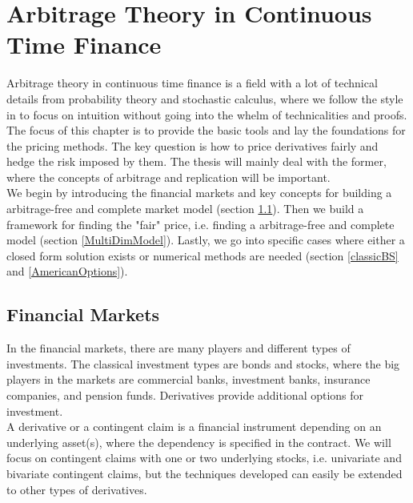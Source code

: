 
\chapter{Arbitrage Theory in Continuous Time Finance} %

\label{Chapter2} %

Arbitrage theory in continuous time finance is a field with a lot of technical details from probability theory and stochastic calculus, where we follow the style in \parencite{Hull, finKont} to focus on intuition without going into the whelm of technicalities and proofs. The focus of this chapter is to provide the basic tools and lay the foundations for the pricing methods. The key question is how to price derivatives fairly and hedge the risk imposed by them. The thesis will mainly deal with the former, where the concepts of arbitrage and replication will be important.\\

We begin by introducing the financial markets and key concepts for building a arbitrage-free and complete market model (section \ref{FinMarket}). Then we build a framework for finding the "fair" price, i.e. finding a arbitrage-free and complete model (section \ref{MultiDimModel}). Lastly, we go into specific cases where either a closed form solution exists or numerical methods are needed (section \ref{classicBS} and \ref{AmericanOptions}).


\section{Financial Markets}\label{FinMarket}
In the financial markets, there are many players and different types of investments. The classical investment types are bonds and stocks, where the big players in the markets are commercial banks, investment banks, insurance companies, and pension funds. Derivatives provide additional options for investment.\\

A derivative or a contingent claim is a financial instrument depending on an underlying asset(s), where the dependency is specified in the contract. We will focus on contingent claims with one or two underlying stocks, i.e. univariate and bivariate contingent claims, but the techniques developed can easily be extended to other types of derivatives. \\

